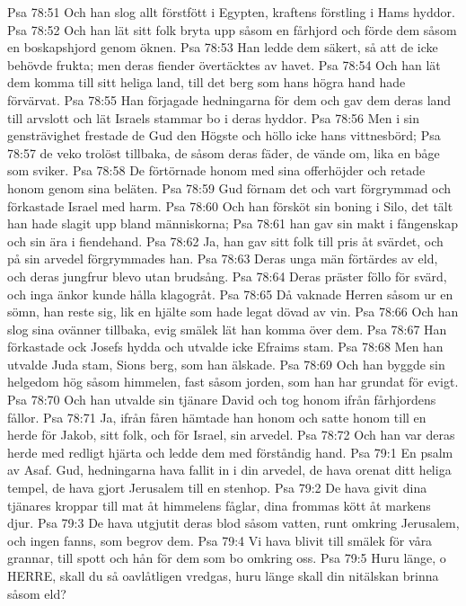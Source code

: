 Psa 78:51  Och han slog allt förstfött i Egypten, kraftens förstling i Hams hyddor.
Psa 78:52  Och han lät sitt folk bryta upp såsom en fårhjord och förde dem såsom en boskapshjord genom öknen.
Psa 78:53  Han ledde dem säkert, så att de icke behövde frukta; men deras fiender övertäcktes av havet.
Psa 78:54  Och han lät dem komma till sitt heliga land, till det berg som hans högra hand hade förvärvat.
Psa 78:55  Han förjagade hedningarna för dem och gav dem deras land till arvslott och lät Israels stammar bo i deras hyddor.
Psa 78:56  Men i sin gensträvighet frestade de Gud den Högste och höllo icke hans vittnesbörd;
Psa 78:57  de veko trolöst tillbaka, de såsom deras fäder, de vände om, lika en båge som sviker.
Psa 78:58  De förtörnade honom med sina offerhöjder och retade honom genom sina beläten.
Psa 78:59  Gud förnam det och vart förgrymmad och förkastade Israel med harm.
Psa 78:60  Och han försköt sin boning i Silo, det tält han hade slagit upp bland människorna;
Psa 78:61  han gav sin makt i fångenskap och sin ära i fiendehand.
Psa 78:62  Ja, han gav sitt folk till pris åt svärdet, och på sin arvedel förgrymmades han.
Psa 78:63  Deras unga män förtärdes av eld, och deras jungfrur blevo utan brudsång.
Psa 78:64  Deras präster föllo för svärd, och inga änkor kunde hålla klagogråt.
Psa 78:65  Då vaknade Herren såsom ur en sömn, han reste sig, lik en hjälte som hade legat dövad av vin.
Psa 78:66  Och han slog sina ovänner tillbaka, evig smälek lät han komma över dem.
Psa 78:67  Han förkastade ock Josefs hydda och utvalde icke Efraims stam.
Psa 78:68  Men han utvalde Juda stam, Sions berg, som han älskade.
Psa 78:69  Och han byggde sin helgedom hög såsom himmelen, fast såsom jorden, som han har grundat för evigt.
Psa 78:70  Och han utvalde sin tjänare David och tog honom ifrån fårhjordens fållor.
Psa 78:71  Ja, ifrån fåren hämtade han honom och satte honom till en herde för Jakob, sitt folk, och för Israel, sin arvedel.
Psa 78:72  Och han var deras herde med redligt hjärta och ledde dem med förståndig hand.
Psa 79:1  En psalm av Asaf. Gud, hedningarna hava fallit in i din arvedel, de hava orenat ditt heliga tempel, de hava gjort Jerusalem till en stenhop.
Psa 79:2  De hava givit dina tjänares kroppar till mat åt himmelens fåglar, dina frommas kött åt markens djur.
Psa 79:3  De hava utgjutit deras blod såsom vatten, runt omkring Jerusalem, och ingen fanns, som begrov dem.
Psa 79:4  Vi hava blivit till smälek för våra grannar, till spott och hån för dem som bo omkring oss.
Psa 79:5  Huru länge, o HERRE, skall du så oavlåtligen vredgas, huru länge skall din nitälskan brinna såsom eld?
